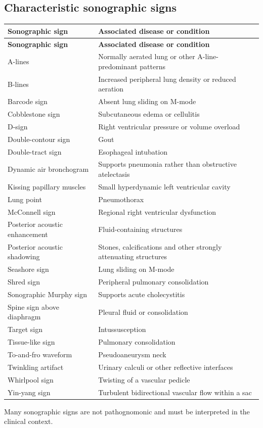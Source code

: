\subsection{Characteristic sonographic signs}
\begin{longtable}{@{}p{}p{}@{}}
\toprule
\textbf{Sonographic sign} & \textbf{Associated disease or condition} \\
\midrule
\endfirsthead
\toprule
\textbf{Sonographic sign} & \textbf{Associated disease or condition} \\
\midrule
\endhead
A-lines & Normally aerated lung or other A-line-predominant patterns \\
B-lines & Increased peripheral lung density or reduced aeration \\
Barcode sign & Absent lung sliding on M-mode \\
Cobblestone sign & Subcutaneous edema or cellulitis \\
D-sign & Right ventricular pressure or volume overload \\
Double-contour sign & Gout \\
Double-tract sign & Esophageal intubation \\
Dynamic air bronchogram & Supports pneumonia rather than obstructive atelectasis \\
Kissing papillary muscles & Small hyperdynamic left ventricular cavity \\
Lung point & Pneumothorax \\
McConnell sign & Regional right ventricular dysfunction \\
Posterior acoustic enhancement & Fluid-containing structures \\
Posterior acoustic shadowing & Stones, calcifications and other strongly attenuating structures \\
Seashore sign & Lung sliding on M-mode \\
Shred sign & Peripheral pulmonary consolidation \\
Sonographic Murphy sign & Supports acute cholecystitis \\
Spine sign above diaphragm & Pleural fluid or consolidation \\
Target sign & Intussusception \\
Tissue-like sign & Pulmonary consolidation \\
To-and-fro waveform & Pseudoaneurysm neck \\
Twinkling artifact & Urinary calculi or other reflective interfaces \\
Whirlpool sign & Twisting of a vascular pedicle \\
Yin-yang sign & Turbulent bidirectional vascular flow within a sac \\
\bottomrule
\end{longtable}
Many sonographic signs are not pathognomonic and must be interpreted in the clinical context.


